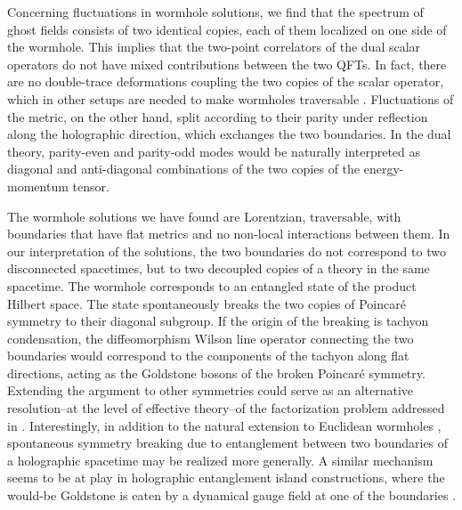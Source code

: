 Concerning fluctuations in wormhole solutions, we find that the spectrum of ghost fields consists of two identical copies, each of them localized on one side of the wormhole.
This implies that the two-point correlators of the dual scalar operators do not have mixed contributions between the two QFTs.
In fact, there are no double-trace deformations coupling the two copies of the scalar operator, which in other setups are needed to make wormholes traversable \eg \cite{Gao:2016bin,Maldacena:2017axo,Maldacena:2018lmt,Caceres:2018ehr,Bak:2018txn,Ahn:2022suv,Khairunnisa:2025ljk,Djogama:2026pmd}.
Fluctuations of the metric, on the other hand, split according to their parity under reflection along the holographic direction, which exchanges the two boundaries.
In the dual theory, parity-even and parity-odd modes would be naturally interpreted as diagonal and anti-diagonal combinations of the two copies of the energy-momentum tensor.

The wormhole solutions we have found are Lorentzian, traversable, with boundaries that have flat metrics and no non-local interactions between them.
In our interpretation of the solutions, the two boundaries do not correspond to two disconnected spacetimes, but to two decoupled copies of a theory in the same spacetime.
The wormhole corresponds to an entangled state of the product Hilbert space.
The state spontaneously breaks the two copies of Poincar\'e symmetry to their diagonal subgroup.
If the origin of the breaking is tachyon condensation, the diffeomorphism Wilson line operator connecting the two boundaries would correspond to the components of the tachyon along flat directions, acting as the Goldstone bosons of the broken Poincar\'e symmetry.
Extending the argument to other symmetries could serve as an alternative resolution--at the level of effective theory--of the factorization problem addressed in \cite{Harlow:2015lma,Guica:2015zpf}.
Interestingly, in addition to the natural extension to Euclidean wormholes \cite{Betzios:2023obs}, spontaneous symmetry breaking due to entanglement between two boundaries of a holographic spacetime may be realized more generally.
A similar mechanism seems to be at play in holographic entanglement island constructions, where the would-be Goldstone is eaten by a dynamical gauge field at one of the boundaries \cite{Geng:2025byh,Geng:2025gqu,Geng:2025gns,Geng:2025rov}.

